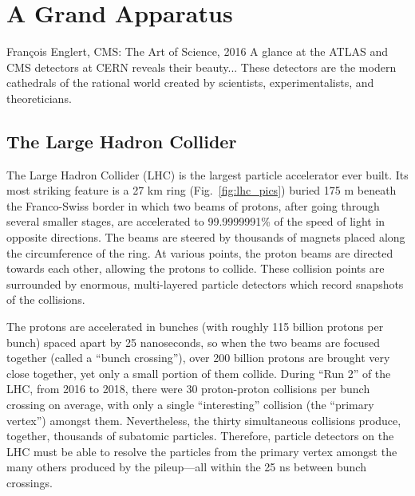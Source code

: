 \chapter{A Grand Apparatus}\label{ch:lhc_cms}
\begin{aquote}{Fran\c{c}ois Englert, CMS: The Art of Science, 2016}
    A glance at the ATLAS and CMS detectors at CERN reveals their beauty...
    These detectors are the modern cathedrals of the rational world created by scientists, experimentalists, and theoreticians. 
\end{aquote}
\section{The Large Hadron Collider}
The Large Hadron Collider (LHC) is the largest particle accelerator ever built. 
Its most striking feature is a 27 km ring (Fig.~\ref{fig:lhc_pics}) buried 175 m beneath the Franco-Swiss border in which two beams of protons, after going through several smaller stages, are accelerated to 99.9999991\% of the speed of light in opposite directions. 
The beams are steered by thousands of magnets placed along the circumference of the ring. 
At various points, the proton beams are directed towards each other, allowing the protons to collide. 
These collision points are surrounded by enormous, multi-layered particle detectors which record snapshots of the collisions. 

The protons are accelerated in bunches (with roughly 115 billion protons per bunch) spaced apart by 25 nanoseconds, so when the two beams are focused together (called a ``bunch crossing''), over 200 billion protons are brought very close together, yet only a small portion of them collide. 
During ``Run 2'' of the LHC, from 2016 to 2018, there were 30 proton-proton collisions per bunch crossing on average, with only a single ``interesting'' collision (the ``primary vertex'') amongst them. %
Nevertheless, the thirty simultaneous collisions produce, together, thousands of subatomic particles. 
Therefore, particle detectors on the LHC must be able to resolve the particles from the primary vertex amongst the many others produced by the pileup---all within the 25 ns between bunch crossings. %

